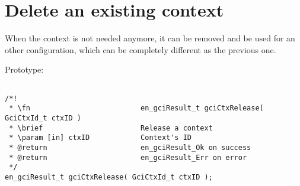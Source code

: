 \newpage

\section{Delete an existing context}
\label{delCtx}

When the context is not needed anymore, it can be removed and be used for an
other configuration, which can be completely different as the previous one.

Prototype:
\begin{lstlisting}

/*!
 * \fn 							en_gciResult_t gciCtxRelease( GciCtxId_t ctxID )
 * \brief						Release a context
 * \param [in] ctxID			Context's ID
 * @return						en_gciResult_Ok on success
 * @return						en_gciResult_Err on error
 */
en_gciResult_t gciCtxRelease( GciCtxId_t ctxID );

\end{lstlisting}
